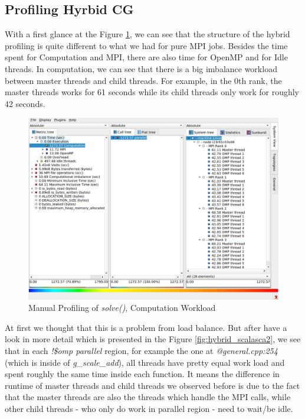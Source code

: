 \documentclass[article]{scrartcl}
\begin{document}
\subsection{Profiling Hyrbid CG}
With a first glance at the Figure \ref{fig:hybrid_scalasca1}, we can see that the structure of the hybrid profiling is quite different to what we had for pure MPI jobs. Besides the time spent for Computation and MPI, there are also time for OpenMP and for Idle threads. In computation, we can see that there is a big imbalance workload between master threads and child threads. For example, in the 0th rank, the master threads works for 61 seconds while its child threads only work for roughly 42 seconds. 

\begin{figure}[htpb]
	\centering
	\includegraphics[width=.9\textwidth,keepaspectratio=true]{../figs/3_3_hybrid_computation.png}
	\caption{Manual Profiling of \textit{solve()}, Computation Workload}
	\label{fig:hybrid_scalasca1}
\end{figure}

At first we thought that this is a problem from load balance. But after have a look in more detail which is presented in the Figure \ref{fig:hybrid_scalasca2}, we see that in each \textit{!\$omp parallel} region, for example the one at \textit{@general.cpp:254} (which is inside of \textit{g\_scale\_add}), all threads have pretty equal work load and spent roughly the same time inside each function. It means the difference in runtime of master threads and child threads we observed before is due to the fact that the master threads are also the threads which handle the MPI calls, while other child threads - who only do work in parallel region - need to wait/be idle. 
\end{document}
